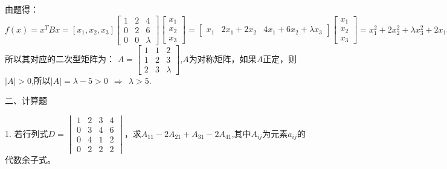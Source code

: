 \documentclass{article}
\begin{document}
\begin{jie}
由题得：
\begin{equation*}
f(x)=x^{T}Bx=[x_1,x_2,x_3]\begin{bmatrix}
  1 & 2 & 4 \\
  0 & 2 & 6\\
  0 & 0 & \lambda
\end{bmatrix}
\begin{bmatrix}
x_1\\ x_2\\ x_3
\end{bmatrix}=\begin{bmatrix}
x_1&  2x_1+2x_2& 4x_1+6x_2+\lambda x_3
\end{bmatrix}\begin{bmatrix}
x_1\\ x_2\\ x_3
\end{bmatrix}=x_1^2+2x_2^2+\lambda x_3^2+2x_1x_2+4x_1x_3+6x_2x_3
\end{equation*}
所以其对应的二次型矩阵为：
$A=\begin{bmatrix}
  1 & 1 & 2 \\
  1 & 2 & 3\\
  2 & 3 & \lambda
\end{bmatrix}$,$A$为对称矩阵，如果$A$正定，则$|A|>0$,所以$|A|=\lambda-5>0~~\Rightarrow~~\lambda>5$.
\end{jie}

二、计算题

1. 若行列式$D=
\begin{vmatrix}
  1 & 2 & 3 & 4 \\
  0 & 3 & 4 & 6 \\
  0 & 4 & 1 & 2 \\
  0 & 2 & 2 & 2
\end{vmatrix}
$，求$A_{11}-2A_{21}+A_{31}-2A_{41}$,其中$A_{ij}$为元素$a_{ij}$的代数余子式。
\end{document}
